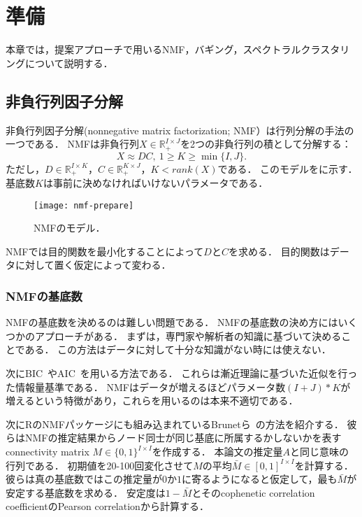 \chapter{準備}
本章では，提案アプローチで用いるNMF，バギング，スペクトラルクラスタリングについて説明する．
\section{非負行列因子分解}
非負行列因子分解(nonnegative matrix factorization; NMF）\cite{Lee1999}は行列分解の手法の一つである．
NMFは非負行列$X \in \mathbb{R}_+^{I \times J}$を2つの非負行列の積として分解する：
\begin{equation}
	X \approx DC, \ 1 \geq K \geq \min\{I, J\}.
\end{equation}
ただし，$D \in \mathbb{R}_+^{I \times K}$，$C \in \mathbb{R}_+^{K \times J}$，$K < rank(X)$である．
このモデルをに示す．
基底数$K$は事前に決めなければいけないパラメータである．

\begin{figure}[htbp]
	\centering
	\texttt{[image: nmf-prepare]}
	\caption{NMFのモデル．}
	\label{fig:nmf-prepare}
\end{figure}

NMFでは目的関数を最小化することによって$D$と$C$を求める．
目的関数はデータに対して置く仮定によって変わる．

\subsection{NMFの基底数}
NMFの基底数を決めるのは難しい問題である．
NMFの基底数の決め方にはいくつかのアプローチがある．
まずは，専門家や解析者の知識に基づいて決めることである．
この方法はデータに対して十分な知識がない時には使えない．

次にBIC~\cite{wasserman2000a}やAIC~\cite{Akaike1974}を用いる方法である．
これらは漸近理論に基づいた近似を行った情報量基準である．
NMFはデータが増えるほどパラメータ数$(I + J) * K$が増えるという特徴があり，これらを用いるのは本来不適切である．

次にRのNMFパッケージにも組み込まれているBrunetら~\cite{Brunet2004}の方法を紹介する．
彼らはNMFの推定結果からノード同士が同じ基底に所属するかしないかを表すconnectivity matrix $M \in \{0, 1\}^{I \times I}$を作成する．
本論文の推定量$A$と同じ意味の行列である．
初期値を20-100回変化させて$M$の平均$\bar{M} \in [0, 1]^{I \times I}$を計算する．
彼らは真の基底数ではこの推定量が$0$か$1$に寄るようになると仮定して，最も$\bar{M}$が安定する基底数を求める．
安定度は$1- \bar{M}$とそのcophenetic correlation coefficientのPearson correlationから計算する．

